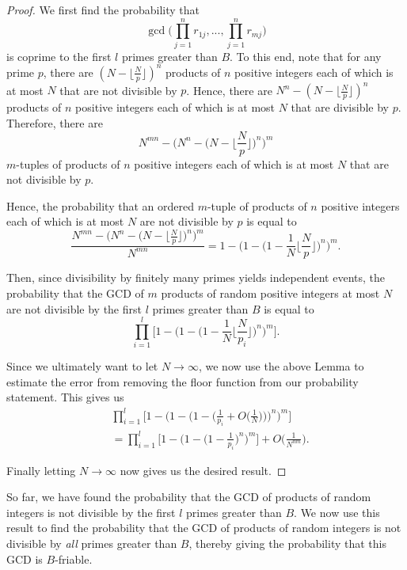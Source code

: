 \documentclass[10pt,a4paper]{article}
\theoremstyle{definition}
\theoremstyle{remark}
\begin{document}
\begin{proof}
We first find the probability that 
$$\gcd\Big(\prod_{j=1}^nr_{1j}, ..., \prod_{j=1}^n r_{mj}\Big)$$
is coprime to the first $l$ primes greater than $B$.  To this end, note that for any prime $p$, there are $(N - \lfloor\frac{N}{p}\rfloor)^n$ products of $n$ positive integers each of which is at most $N$ that are not divisible by $p$. Hence, there are $N^n - (N - \lfloor\frac{N}{p}\rfloor)^n$ products of $n$ positive integers each of which is at most $N$ that are divisible by $p$. Therefore, there are 
$$N^{mn} - \Big(N^n - \Big(N - \Big\lfloor\frac{N}{p}\Big\rfloor\Big)^n\Big)^m$$
$m$-tuples of products of $n$ positive integers each of which is at most $N$ that are not divisible by $p$.

Hence, the probability that an ordered $m$-tuple of products of $n$ positive integers each of which is at most $N$ are not divisible by $p$ is equal to
$$\frac{N^{mn} - \Big(N^n - \Big(N - \Big\lfloor\frac{N}{p}\Big\rfloor\Big)^n\Big)^m}{N^{mn}} = 1 - \Big(1 - \Big(1 - \frac{1}{N} \Big\lfloor\frac{N}{p}\Big\rfloor\Big)^n\Big)^m.$$

Then, since divisibility by finitely many primes yields independent events, the probability that the GCD of $m$ products of random positive integers at most $N$ are not divisible by the first $l$ primes greater than $B$ is equal to
$$\prod_{i=1}^l \Big[1 - \Big(1 - \Big(1 - \frac{1}{N}\Big\lfloor\frac{N}{p_i}\Big\rfloor\Big)^n\Big)^m\Big].$$

Since we ultimately want to let $N \to \infty$, we now use the above Lemma to estimate the error from removing the floor function from our probability statement. This gives us
\begin{align*}& \prod_{i=1}^l \Big[1 - \Big(1 - \Big(1 - \Big(\frac{1}{p_i} + O\Big(\frac{1}{N}\Big)\Big) \Big)^n\Big)^m\Big]\\
&= \prod_{i=1}^l \Big[1 - \Big(1 - \Big(1 - \frac{1}{p_i}  \Big)^n\Big)^m\Big] + O\Big(\frac{1}{N^{nm}}\Big).\end{align*}

\noindent Finally letting $N \to \infty$ now gives us the desired result.
\end{proof}

So far, we have found the probability that the GCD of products of random integers is not divisible by the first \(l\) primes greater than \(B\). We now use this result to find the probability that the GCD of products of random integers is not divisible by \textit{all} primes greater than $B$, thereby giving the probability that this GCD is $B$-friable.
\end{document}
